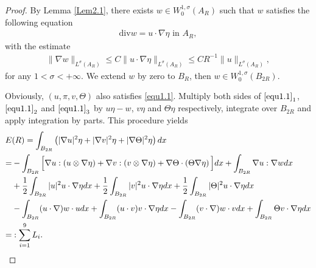 \documentclass[11pt,reqno]{amsart}
\numberwithin{Thm}{section}
\begin{document}
\begin{proof}
By Lemma \ref{Lem2.1}, there exists $w\in W_{0}^{1,\sigma}(A_R)$ such that $w$ satisfies the following equation
	\begin{align*}
		\mathrm{div} w=u\cdot\nabla\eta \text{ in }A_R,
	\end{align*}
	with the estimate
	\begin{align}\label{ine4.4}
		\|\nabla w\|_{L^\sigma(A_R)}\leq C\|u\cdot\nabla\eta\|_{L^\sigma(A_R)}\leq CR^{-1}\|u\|_{L^\sigma(A_R)},
	\end{align}
	for any $1<\sigma<+\infty$. We extend $w$ by zero to $B_R$, then $w\in W_{0}^{1,\sigma}(B_{2R}).$
	
Obviously, $(u,\pi,v,\Theta)$ also satisfies \eqref{equ1.1}.	
Multiply both sides of $\eqref{equ1.1}_{1}$, $\eqref{equ1.1}_{2}$ and $\eqref{equ1.1}_{3}$ by $u \eta-w$, $v \eta$ and $\Theta \eta$ respectively, integrate over $B_{2R}$ and apply integration by parts. This procedure yields
	\begin{align}\label{ine4.6}
		E&(R)=\int_{B_{2R}}\left(|\nabla u|^{2}\eta+|\nabla v|^{2}\eta+|\nabla \Theta|^{2}\eta\right) d x\notag\\
		=&-\int_{B_{2R}}\Big[\nabla u:(u\otimes\nabla\eta)+\nabla v:(v\otimes\nabla\eta)+\nabla \Theta \cdot \left(\Theta\nabla \eta\right)\Big]d x+\int_{B_{2R}}\nabla u:\nabla w dx\notag\\
		&+\frac{1}{2} \int_{B_{2R}}|u|^2u \cdot \nabla \eta d x+\frac{1}{2} \int_{B_{2R}}|v|^2u \cdot \nabla \eta d x+\frac{1}{2} \int_{B_{2R}}|\Theta|^2u \cdot \nabla \eta d x\\
		&- \int_{B_{2R}}(u \cdot\nabla )w \cdot u dx+\int_{B_{2R}}(u \cdot v )v \cdot \nabla\eta dx -\int_{B_{2R}}(v \cdot\nabla)w\cdot v dx+\int_{B_{2R}}\Theta v\cdot\nabla \eta dx\notag\\
       =&:\sum_{i=1}^9L_i.\notag
	\end{align}



\end{proof}
\end{document}
